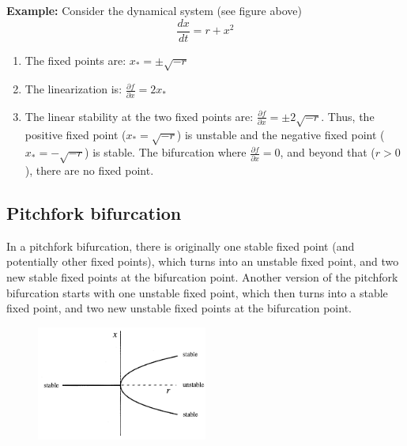 \documentclass[12pt]{article}
\theoremstyle{definition}
\newcommand{\pd}[2]{\frac{\partial {#1}}{\partial {#2}}}
\begin{document}
\begin{shaded}
\textbf{Example:} Consider the dynamical system (see figure above)
\begin{equation}
\frac{dx}{dt} = r + x^2
\end{equation}
\begin{enumerate}
\item The fixed points are: $x_* = \pm \sqrt{-r}$
\item The linearization is: $\pd{f}{x} = 2x_*$
\item The linear stability at the two fixed points are: $\pd{f}{x} = \pm 2 \sqrt{-r}$. Thus, the positive fixed point ($x_* = \sqrt{-r}$) is unstable and the negative fixed point ($x_* = -\sqrt{-r}$) is stable. The bifurcation where $\pd{f}{x}=0$, and beyond that ($r>0$), there are no fixed point.
\end{enumerate}
\end{shaded}

\subsection{Pitchfork bifurcation}
In a pitchfork bifurcation, there is originally one stable fixed point (and potentially other fixed points), which turns into an unstable fixed point, and two new stable fixed points at the bifurcation point. Another version of the pitchfork bifurcation starts with one unstable fixed point, which then turns into a stable fixed point, and two new unstable fixed points at the bifurcation point.

\begin{figure}[h]
  \begin{center}
\includegraphics[width=0.5\textwidth]{Pitchfork_bifurcation_diagram.png}
  \end{center}
\end{figure}
\end{document}
